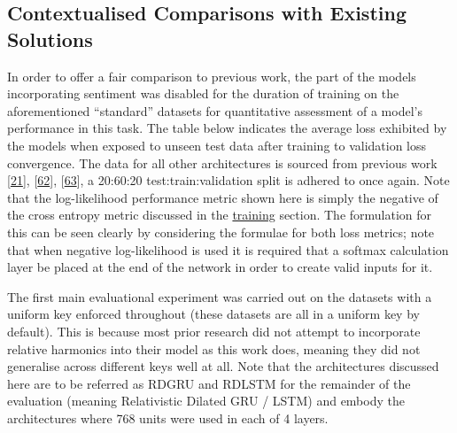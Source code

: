 \documentclass[12pt,]{article}
\begin{document}
\hypertarget{contextualised-comparisons-with-existing-solutions}{%
\subsection{Contextualised Comparisons with Existing
Solutions}\label{contextualised-comparisons-with-existing-solutions}}

In order to offer a fair comparison to previous work, the part of the
models incorporating sentiment was disabled for the duration of training
on the aforementioned ``standard'' datasets for quantitative assessment
of a model's performance in this task. The table below indicates the
average loss exhibited by the models when exposed to unseen test data
after training to validation loss convergence. The data for all other
architectures is sourced from previous work
{[}\protect\hyperlink{ref-boulanger2012modeling}{21}{]},
{[}\protect\hyperlink{ref-johnson2017generating}{62}{]},
{[}\protect\hyperlink{ref-vohra2015modeling}{63}{]}, a 20:60:20
test:train:validation split is adhered to once again. Note that the
log-likelihood performance metric shown here is simply the negative of
the cross entropy metric discussed in the
\protect\hyperlink{training}{training} section. The formulation for this
can be seen clearly by considering the formulae for both loss metrics;
note that when negative log-likelihood is used it is required that a
softmax calculation layer be placed at the end of the network in order
to create valid inputs for it.

The first main evaluational experiment was carried out on the datasets
with a uniform key enforced throughout (these datasets are all in a
uniform key by default). This is because most prior research did not
attempt to incorporate relative harmonics into their model as this work
does, meaning they did not generalise across different keys well at all.
Note that the architectures discussed here are to be referred as RDGRU
and RDLSTM for the remainder of the evaluation (meaning Relativistic
Dilated GRU / LSTM) and embody the architectures where 768 units were
used in each of 4 layers.
\end{document}
